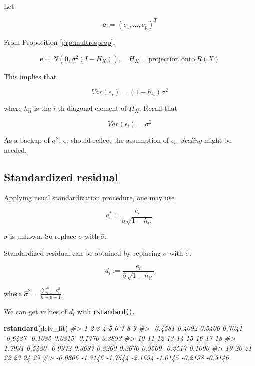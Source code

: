\documentclass[]{book}
\newenvironment{Shaded}{\begin{snugshade}}{\end{snugshade}}
\newcommand{\CommentTok}[1]{\textcolor[rgb]{0.56,0.35,0.01}{\textit{#1}}}
\newcommand{\KeywordTok}[1]{\textcolor[rgb]{0.13,0.29,0.53}{\textbf{#1}}}
\newcommand{\NormalTok}[1]{#1}
\theoremstyle{definition}
\theoremstyle{definition}
\theoremstyle{definition}
\theoremstyle{remark}
\let\BeginKnitrBlock\begin \let\EndKnitrBlock\end
\begin{document}
Let

\[\mathbf{e} := (e_1, \ldots, e_p)^T\]

From Proposition \ref{prp:multresprop},

\[\mathbf{e} \sim N(\mathbf{0}, \sigma^2(I - H_X)), \quad H_X = \text{projection onto}\: R(X)\]

This implies that

\[Var(e_i) = (1 - h_{ii})\sigma^2\]

where \(h_{ii}\) is the \(i\)-th diagonal element of \(H_X\). Recall that

\[Var(\epsilon_i) = \sigma^2\]

As a backup of \(\sigma^2\), \(e_i\) should reflect the assumption of \(\epsilon_i\). \emph{Scaling} might be needed.

\hypertarget{standardized-residual}{%
\subsection{Standardized residual}\label{standardized-residual}}

Applying usual standardization procedure, one may use

\begin{equation}
  e_i^{\ast} = \frac{e_i}{\sigma \sqrt{1 - h_{ii}}}
  \label{eq:stdunknown}
\end{equation}

\(\sigma\) is unkown. So replace \(\sigma\) with \(\hat\sigma\).

\BeginKnitrBlock{definition}[Standardized residual]
\protect\hypertarget{def:stdresid}{}{\label{def:stdresid} {} }Standardized residual can be obtained by replacing \(\sigma\) with \(\hat\sigma\).

\[d_i := \frac{e_i}{\hat\sigma \sqrt{1 - h_{ii}}}\]

where \(\hat\sigma^2 = \frac{\sum\limits_{i = 1}^n e_i^2}{n - p - 1}\).
\EndKnitrBlock{definition}

We can get values of \(d_i\) with \texttt{rstandard()}.

\begin{Shaded}
\begin{Highlighting}[]
\KeywordTok{rstandard}\NormalTok{(delv_fit)}
\CommentTok{#>       1       2       3       4       5       6       7       8       9 }
\CommentTok{#> -0.4581  0.4092  0.5406  0.7041 -0.6437 -0.1085  0.0815 -0.1770  3.3893 }
\CommentTok{#>      10      11      12      13      14      15      16      17      18 }
\CommentTok{#>  1.7931  0.5480 -0.9972  0.3637  0.8260  0.2670  0.9569 -0.2517  0.1090 }
\CommentTok{#>      19      20      21      22      23      24      25 }
\CommentTok{#> -0.0866 -1.3146 -1.7544 -2.1694 -1.0145 -0.2198 -0.3146}
\end{Highlighting}
\end{Shaded}
\end{document}
